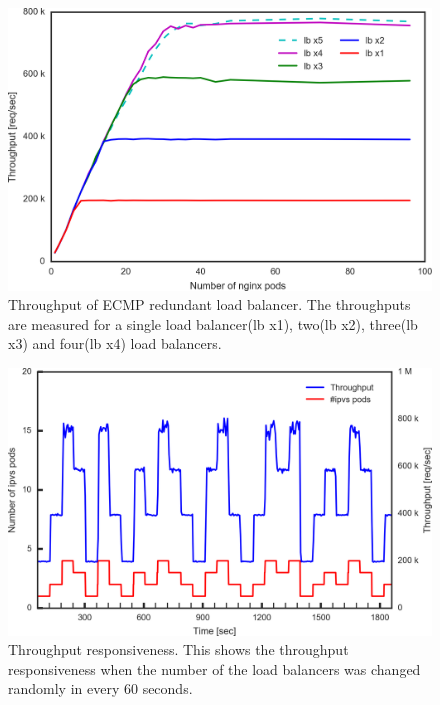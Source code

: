 \begin{figure}[h]
  \centering
  \includegraphics[width=0.9\columnwidth,left]{Figs/ecmp_lb_cubic_ieice}
  \centering
  \begin{minipage}{0.9\columnwidth}
        \caption[Throughput of ECMP redundant load balancer]{
          Throughput of ECMP redundant load balancer.
          The throughputs are measured for a single load balancer(lb x1), two(lb x2), three(lb x3) and four(lb x4) load balancers.
        }
  \end{minipage}
  \label{fig:ecmp_lb_cubic_ieice}
\end{figure}

\begin{figure}[h]
  \centering
  \includegraphics[width=0.98\columnwidth,left]{Figs/ecmp_response_ieice}
  \centering
  \begin{minipage}{0.9\columnwidth}
    \caption[Throughput responsiveness]{
      Throughput responsiveness.
      This shows the throughput responsiveness when the number of the load balancers was changed randomly in every 60 seconds.
    }
  \end{minipage}
  \label{fig:ecmp_response_ieice}
\end{figure}


